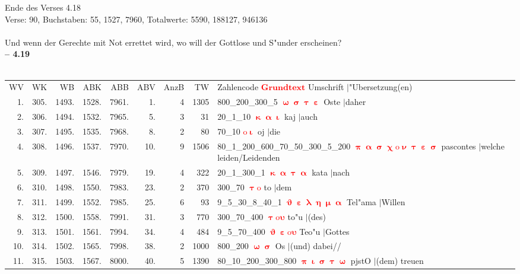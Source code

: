 \documentclass[a4paper,10pt,landscape]{article}
\begin{document}
Ende des Verses 4.18\\
Verse: 90, Buchstaben: 55, 1527, 7960, Totalwerte: 5590, 188127, 946136\\
\\
Und wenn der Gerechte mit Not errettet wird, wo will der Gottlose und S"under erscheinen?\\
\newpage 
{\bf -- 4.19}\\
\medskip \\
\begin{tabular}{rrrrrrrrp{120mm}}
WV&WK&WB&ABK&ABB&ABV&AnzB&TW&Zahlencode \textcolor{red}{$\boldsymbol{Grundtext}$} Umschrift $|$"Ubersetzung(en)\\
1.&305.&1493.&1528.&7961.&1.&4&1305&800\_200\_300\_5 \textcolor{red}{$\boldsymbol{\upomega\upsigma\uptau\upepsilon}$} Oste $|$daher\\
2.&306.&1494.&1532.&7965.&5.&3&31&20\_1\_10 \textcolor{red}{$\boldsymbol{\upkappa\upalpha\upiota}$} kaj $|$auch\\
3.&307.&1495.&1535.&7968.&8.&2&80&70\_10 \textcolor{red}{$\boldsymbol{\mathrm{o}\upiota}$} oj $|$die\\
4.&308.&1496.&1537.&7970.&10.&9&1506&80\_1\_200\_600\_70\_50\_300\_5\_200 \textcolor{red}{$\boldsymbol{\uppi\upalpha\upsigma\upchi\mathrm{o}\upnu\uptau\upepsilon\upsigma}$} pascontes $|$welche leiden/Leidenden\\
5.&309.&1497.&1546.&7979.&19.&4&322&20\_1\_300\_1 \textcolor{red}{$\boldsymbol{\upkappa\upalpha\uptau\upalpha}$} kata $|$nach\\
6.&310.&1498.&1550.&7983.&23.&2&370&300\_70 \textcolor{red}{$\boldsymbol{\uptau\mathrm{o}}$} to $|$dem\\
7.&311.&1499.&1552.&7985.&25.&6&93&9\_5\_30\_8\_40\_1 \textcolor{red}{$\boldsymbol{\upvartheta\upepsilon\uplambda\upeta\upmu\upalpha}$} Tel"ama $|$Willen\\
8.&312.&1500.&1558.&7991.&31.&3&770&300\_70\_400 \textcolor{red}{$\boldsymbol{\uptau\mathrm{o}\upsilon}$} to"u $|$(des)\\
9.&313.&1501.&1561.&7994.&34.&4&484&9\_5\_70\_400 \textcolor{red}{$\boldsymbol{\upvartheta\upepsilon\mathrm{o}\upsilon}$} Teo"u $|$Gottes\\
10.&314.&1502.&1565.&7998.&38.&2&1000&800\_200 \textcolor{red}{$\boldsymbol{\upomega\upsigma}$} Os $|$(und) dabei//\\
11.&315.&1503.&1567.&8000.&40.&5&1390&80\_10\_200\_300\_800 \textcolor{red}{$\boldsymbol{\uppi\upiota\upsigma\uptau\upomega}$} pjstO $|$(dem) treuen\\

\end{tabular}
\end{document}

